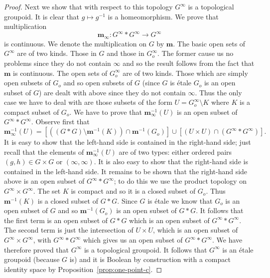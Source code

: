 \documentclass[a4paper]{amsart}
\begin{document}
\begin{proof}
Next we show that with respect to this topology $G^{\infty}$ is a topological groupoid.
It is clear that $g \mapsto g^{-1}$ is a homeomorphism.
We prove that multiplication
$$\mathbf{m}_{\infty} \colon G^{\infty} \ast G^{\infty} \rightarrow G^{\infty}$$ 
is continuous.
We denote the multiplication on $G$ by $\mathbf{m}$.
The basic open sets of $G^{\infty}$ are of two kinds.
Those in $G$ and those in $G_{o}^{\infty}$.
The former cause us no problems since they do not contain $\infty$
and so the result follows from the fact that $\mathbf{m}$ is continuous.
The open sets of $G_{o}^{\infty}$ are of two kinds.
Those which are simply open subsets of $G_{o}$ and so open subsets of $G$
(since $G$ is \'etale $G_{o}$ is an open subset of $G$)
are dealt with above since they do not contain $\infty$.
Thus the only case we have to deal with are those subsets of the form $U = G_{o}^{\infty} \setminus K$ where $K$ is a compact subset of $G_{o}$.
We have to prove that $\mathbf{m}_{\infty}^{-1} (U)$ is an open subset of $G^{\infty} \ast G^{\infty}$.
Observe first that 
$$\mathbf{m}_{\infty}^{-1} (U)
=
[((G \ast G) \setminus \mathbf{m}^{-1}(K)) \cap \mathbf{m}^{-1}(G_{o})]
\cup 
[(U \times U) \cap (G^{\infty} \ast G^{\infty})].$$
It is easy to show that the left-hand side is contained in the right-hand side;
just recall that the elements of $\mathbf{m}_{\infty}^{-1}(U)$ are of two types:
either ordered pairs $(g,h) \in G \times G$ or $(\infty, \infty)$.
It is also easy to show that the right-hand side is contained in the left-hand side.
It remains to be shown that the right-hand side above is an open subset of $G^{\infty} \ast G^{\infty}$;
to do this we use the product topology on $G^{\infty} \times G^{\infty}$.
The set $K$ is compact and so it is a closed subset of $G_{o}$.
Thus $\mathbf{m}^{-1}(K)$ is a closed subset of $G \ast G$.
Since $G$ is \'etale we know that $G_{o}$ is an open subset of $G$ and so $\mathbf{m}^{-1}(G_{o})$
is an open subset of $G \ast G$.
It follows that the first term is an open subset of $G \ast G$ which is an open subset of $G^{\infty} \ast G^{\infty}$.
The second term is just the intersection of $U \times U$, which is an open subset of $G^{\infty} \times G^{\infty}$,
with $G^{\infty} \ast G^{\infty}$ which gives us an open subset of $G^{\infty} \ast G^{\infty}$.
We have therefore proved that $G^{\infty}$ is a topological groupoid.
It follows that $G^{\infty}$ is an \'etale groupoid (because $G$ is)
and it is Boolean by construction with a compact identity space by Proposition~\ref{prop:one-point-c}. 
\end{proof}
\end{document}
